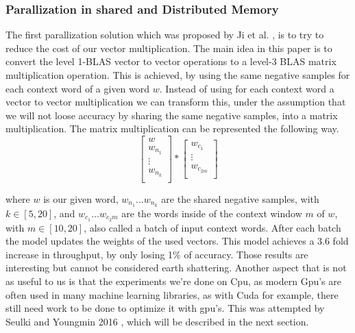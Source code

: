 {\subsubsection{Parallization in shared and Distributed Memory}
The first parallization solution which was proposed by Ji et al. \cite{intel}, is to try to reduce the cost of our vector multiplication. The main idea in this paper is to convert the level 1-BLAS vector to vector operations to a level-3 BLAS matrix multiplication operation. This is achieved, by using the same negative samples for each context word of a given word $w$. Instead of using for each context word a vector to vector multiplication we can transform this, under the assumption that we will not loose accuracy by sharing the same negative samples,  into a matrix multiplication. The matrix multiplication can be represented the following way.
\[
\begin{bmatrix}
w \\
w_{n_1}  \\
\vdots \\
w_{n_k}\\
\end{bmatrix}
*
\begin{bmatrix}
w_{c_1}\\
\vdots\\
w_{c_{2m}}\\
\end{bmatrix}
\]

where $w$ is our given word, $w_{n_1}...w_{n_k}$ are the shared negative samples, with $k \in [5,20]$, and $w_{c_1}...w_{c_2m}$ are the words inside of the context window $m$ of $w$, with $m \in [10,20]$, also called a batch of input context words. After each batch the model updates the weights of the used vectors. 
This model achieves a 3.6 fold increase in throughput, by only losing 1\% of accuracy.  Those results are interesting but cannot be considered earth shattering. Another aspect that is not as useful to us is that the experiments we're done on Cpu, as modern Gpu's are often used in many machine learning libraries, as with Cuda for example, there still need work to be done to optimize it with gpu's. This was attempted by Seulki and Youngmin 2016 \cite{gpu}, which will be described in the next section.


}
